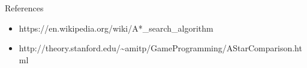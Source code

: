 \documentclass[ignorenonframetext,]{beamer}
\providecommand{\tightlist}{%
  \setlength{\itemsep}{0pt}\setlength{\parskip}{0pt}}
\begin{document}
\begin{frame}{References}
\protect\hypertarget{references}{}

\begin{itemize}
\tightlist
\item
  https://en.wikipedia.org/wiki/A*\_search\_algorithm
\item
  http://theory.stanford.edu/\textasciitilde{}amitp/GameProgramming/AStarComparison.html
\end{itemize}

\end{frame}
\end{document}
